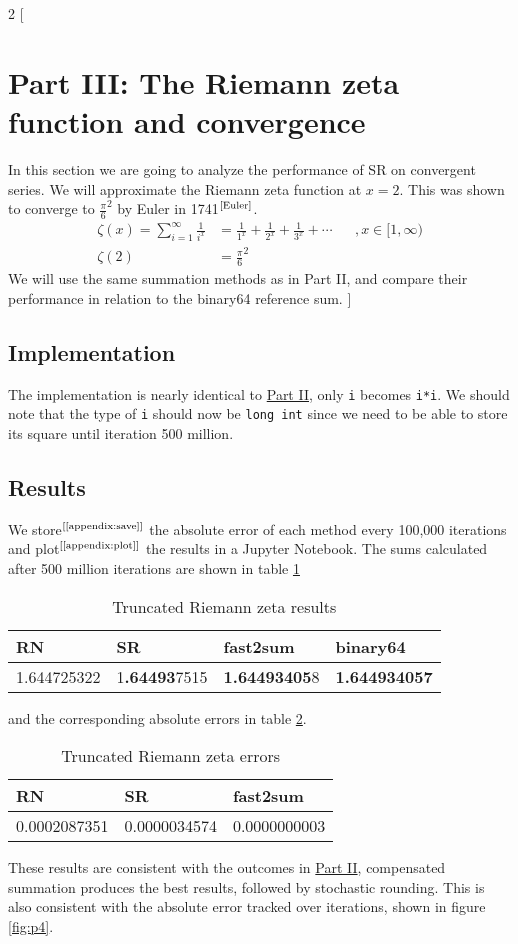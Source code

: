 \documentclass[a4paper]{article} %
\begin{document}
\begin{multicols}{2}
[
\section{Part III: The Riemann zeta function and convergence}
In this section we are going to analyze the performance of SR on convergent series. We will approximate the Riemann zeta function at $x = 2$. This was shown to converge to $\frac{\pi}{6}^2$ by Euler in 1741$^\text{\cite{Euler}}$.
\begin{align}
    \zeta(x) = \sum_{i=1}^\infty \frac{1}{i^x} &= \frac{1}{1^x} + \frac{1}{2^x} + \frac{1}{3^x} + \cdots && , x \in [1, \infty) \\
    \zeta(2) &= \frac{\pi}{6}^2
\end{align}
We will use the same summation methods as in Part II, and compare their performance in relation to the binary64 reference sum.
]

\subsection{Implementation}
The implementation is nearly identical to \hyperref[part2]{Part II}, only \verb|i| becomes \verb|i*i|. We should note that the type of \verb|i| should now be \verb|long int| since we need to be able to store its square until iteration 500 million.

\subsection{Results}
We store$^\text{[\ref{appendix:save}]}$ the absolute error of each method every 100,000 iterations and plot$^\text{[\ref{appendix:plot}]}$ the results in a Jupyter Notebook. The sums calculated after 500 million iterations are shown in table \ref{table:5}
\begin{table}[H]
\small
\centering
\begin{tabular}{ |p{1.7cm}|p{1.7cm}|p{1.7cm}|p{1.7cm}| }
 \hline
 RN & SR & fast2sum & \textbf{binary64} \\
 \hline
 1.644725322 & 1\textbf{.64493}7515 & \textbf{1.64493405}8 & \textbf{1.644934057}  \\
 \hline
\end{tabular}
\caption{Truncated Riemann zeta results}
\label{table:5}
\end{table}
and the corresponding absolute errors in table \ref{table:6}.
\begin{table}[H]
\centering
\small
\begin{tabular}{ |p{1.9cm}|p{1.9cm}|p{1.9cm}| }
 \hline
 RN & SR & fast2sum \\
 \hline
 0.0002087351 & 0.0000034574 & 0.0000000003 \\
 \hline
\end{tabular}
\caption{Truncated Riemann zeta errors}
\label{table:6}
\end{table}
These results are consistent with the outcomes in \hyperref[part2]{Part II}, compensated summation produces the best results, followed by stochastic rounding. This is also consistent with the absolute error tracked over iterations, shown in figure \ref{fig:p4}.


\end{multicols}
\end{document}
